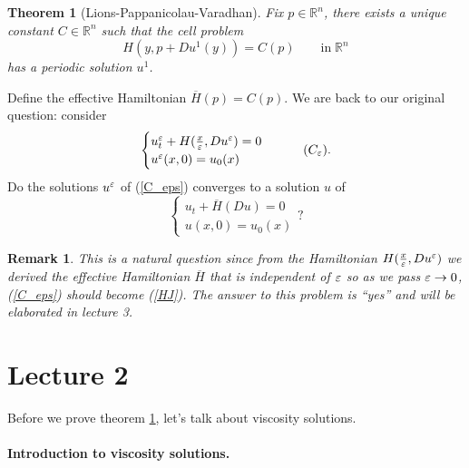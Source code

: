 \documentclass[12pt, oneside]{amsart}  	%
\newtheorem{remark}{Remark}
\newtheorem{theorem}{Theorem}
\begin{document}
\begin{theorem}[Lions-Pappanicolau-Varadhan]\label{theorem1}
 Fix $p\in \mathbb{R}^n$, there exists a unique constant $C\in \mathbb{R}^n$ such that the cell problem
\begin{equation*}
H(y, p+Du^1(y)) = C(p) \qquad\text{in}\;\mathbb{R}^n
\end{equation*}
has a periodic solution $u^1$.
\end{theorem}
Define the effective Hamiltonian $\overline{H}(p) = C(p)$. We are back to our original question: consider
\begin{equation}\label{C_eps}
	\begin{cases}
		u^\eps_t + H(\frac{x}{\eps}, Du^\eps)=0\\
		u^\eps(x,0)=u_0(x)
	\end{cases}\tag{$C_\eps$}.
\end{equation}
Do the solutions $u^\varepsilon$ of (\ref{C_eps}) converges to a solution $u$ of
\begin{equation} \label{HJ}
	\begin{cases}
		u_t + \overline{H}(Du)=0\\
		u(x,0)=u_0(x)
	\end{cases}?\tag{HJ}
\end{equation}
\begin{remark} This is a natural question  since from the Hamiltonian $H(\frac{x}{\varepsilon}, Du^\varepsilon)$ we derived the effective Hamiltonian $\overline{H}$ that is independent of $\varepsilon$ so as we pass $\varepsilon\to 0$, (\ref{C_eps}) should become (\ref{HJ}). The answer to this problem is ``yes'' and will be elaborated in lecture 3.
\end{remark}






\newpage


\section*{{\LARGE Lecture 2}}
\vspace*{0.5cm}

Before we prove theorem \ref{theorem1}, let's talk about viscosity solutions. \vspace*{0.5cm}

\paragraph{\textbf{Introduction to viscosity solutions.}}
\end{document}
